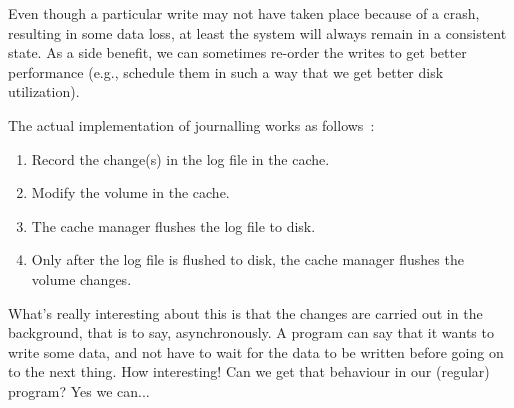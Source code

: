 Even though a particular write may not have taken place because of a crash, resulting in some data loss, at least the system will always remain in a consistent state. As a side benefit, we can sometimes re-order the writes to get better performance (e.g., schedule them in such a way that we get better disk utilization).


The actual implementation of journalling works as follows~\cite{russ}:

\begin{enumerate}
	\item Record the change(s) in the log file in the cache.
	\item Modify the volume in the cache.
	\item The cache manager flushes the log file to disk.
	\item Only after the log file is flushed to disk, the cache manager flushes the volume changes.
\end{enumerate}

What's really interesting about this is that the changes are carried out in the background, that is to say, asynchronously. A program can say that it wants to write some data, and not have to wait for the data to be written before going on to the next thing. How interesting! Can we get that behaviour in our (regular) program? Yes we can...



